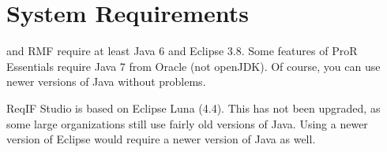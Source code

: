 \section{System Requirements}
\label{sec:system_requirements}

\pror{} and RMF require at least Java 6 and Eclipse 3.8.  Some features of ProR Essentials require Java 7 from Oracle (not openJDK). Of course, you can use newer versions of Java without problems.

ReqIF Studio is based on Eclipse Luna (4.4). This has not been upgraded, as some large organizations still use fairly old versions of Java. Using a newer version of Eclipse would require a newer version of Java as well.

